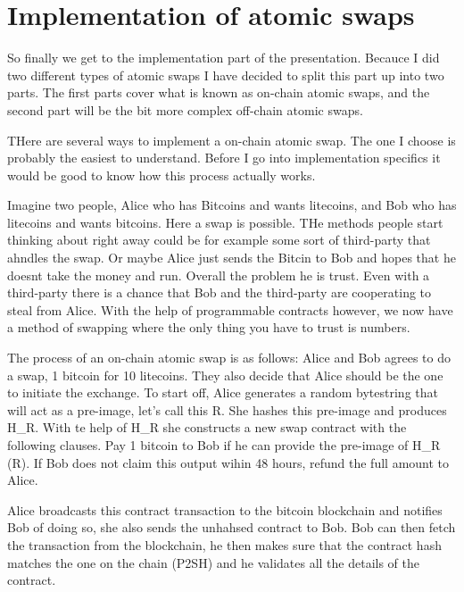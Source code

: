 \chapter{Implementation of atomic swaps}
So finally we get to the implementation part of the presentation. Becauce I did
two different types of atomic swaps I have decided to split this part up into two parts.
The first parts cover what is known as on-chain atomic swaps, and the second part
will be the bit more complex off-chain atomic swaps.

THere are several ways to implement a on-chain atomic swap. The one I choose 
is probably the easiest to understand. Before I go into implementation specifics 
it would be good to know how this process actually works. 

Imagine two people, Alice who has Bitcoins and wants litecoins, and Bob who
has litecoins and wants bitcoins. Here a swap is possible. THe methods people
start thinking about right away could be for example some sort of third-party
that ahndles the swap. Or maybe Alice just sends the Bitcin to Bob and hopes
that he doesnt take the money and run. Overall the problem he is trust. 
Even with a third-party there is a chance that Bob and the third-party
are cooperating to steal from Alice. With the help of programmable contracts 
however, we now have a method of swapping where the only thing you have to 
trust is numbers.

The process of an on-chain atomic swap is as follows:
Alice and Bob agrees to do a swap, 1 bitcoin for 10 litecoins. They also 
decide that Alice should be the one to initiate the exchange. 
To start off, Alice generates a random bytestring that will act as a 
pre-image, let's call this R. She hashes this pre-image and produces H_R.  
With te help of H_R she constructs a new swap contract with the following clauses. Pay 1
bitcoin to Bob if he can provide the pre-image of H_R (R). If Bob does not claim 
this output wihin 48 hours, refund the full amount to Alice. 

Alice broadcasts this contract transaction to the bitcoin blockchain and
notifies Bob of doing so, she also sends the unhahsed contract to Bob. 
Bob can then fetch the transaction from the blockchain, he then makes
sure that the contract hash matches the one on the chain (P2SH) and
he validates all the details of the contract. 
